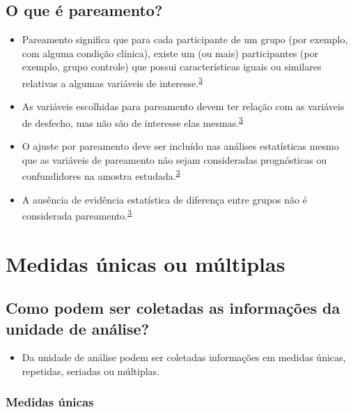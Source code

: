 \documentclass[
]{book}
\providecommand{\tightlist}{%
  \setlength{\itemsep}{0pt}\setlength{\parskip}{0pt}}
\begin{document}
\hypertarget{o-que-uxe9-pareamento}{%
\subsection{O que é pareamento?}\label{o-que-uxe9-pareamento}}

\begin{itemize}
\item
  Pareamento significa que para cada participante de um grupo (por exemplo, com alguma condição clínica), existe um (ou mais) participantes (por exemplo, grupo controle) que possui características iguais ou similares relativas a algumas variáveis de interesse.\textsuperscript{\protect\hyperlink{ref-Bland1994}{3}}
\item
  As variáveis escolhidas para pareamento devem ter relação com as variáveis de desfecho, mas não são de interesse elas mesmas.\textsuperscript{\protect\hyperlink{ref-Bland1994}{3}}
\item
  O ajuste por pareamento deve ser incluído nas análises estatísticas mesmo que as variáveis de pareamento não sejam consideradas prognósticas ou confundidores na amostra estudada.\textsuperscript{\protect\hyperlink{ref-Bland1994}{3}}
\item
  A ausência de evidência estatística de diferença entre grupos não é considerada pareamento.\textsuperscript{\protect\hyperlink{ref-Bland1994}{3}}
\end{itemize}

\hypertarget{medidas}{%
\section{Medidas únicas ou múltiplas}\label{medidas}}

\hypertarget{como-podem-ser-coletadas-as-informauxe7uxf5es-da-unidade-de-anuxe1lise}{%
\subsection{Como podem ser coletadas as informações da unidade de análise?}\label{como-podem-ser-coletadas-as-informauxe7uxf5es-da-unidade-de-anuxe1lise}}

\begin{itemize}
\tightlist
\item
  Da unidade de análise podem ser coletadas informações em medidas únicas, repetidas, seriadas ou múltiplas.
\end{itemize}

\hypertarget{medidas-uxfanicas}{%
\subsubsection{Medidas únicas}\label{medidas-uxfanicas}}
\end{document}
